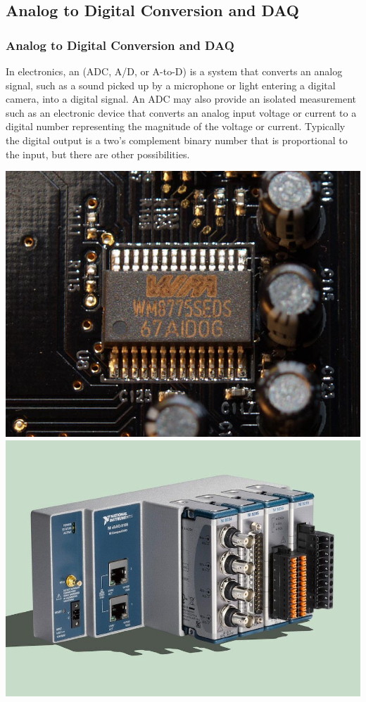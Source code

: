 \documentclass[fleqn]{beamer} %
\newcommand{\sectionIsubsectionIIItitle}{Analog to Digital Conversion and DAQ}
\begin{document}
		\subsection{\sectionIsubsectionIIItitle}\label{sectionIsubsectionIII}
			\begin{frame} 
				\frametitle{\sectionIsubsectionIIItitle} \scriptsize

				\bigskip
				
				In electronics, an \underline{\hspace{20mm}} (ADC, A/D, or A-to-D) is a system that converts an analog signal, such as a sound picked up by a microphone or light entering a digital camera, into a digital signal. An ADC may also provide an isolated measurement such as an electronic device that converts an analog input voltage or current to a digital number representing the magnitude of the voltage or current. Typically the digital output is a two's complement binary number that is proportional to the input, but there are other possibilities.

				\includegraphics[scale=.15]{images/WM_WM8775SEDS-AB.jpg} \hspace{5mm} \includegraphics[scale=.15]{images/ni_cdaq.jpg}


\end{frame}
\end{document}
